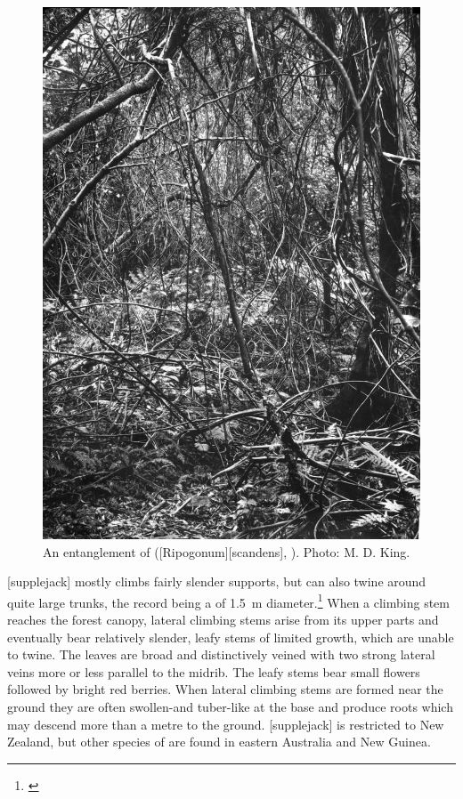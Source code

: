 \begin{figure}[t]
\begin{minipage}[t]{\textwidth}
\begin{minipage}[t]{(\textwidth-\fgap) * \real{0.488}}
			\includegraphics[width=\textwidth]{graphics/fig_033}
			\caption[An entanglement of supplejack]{An entanglement of  ([Ripogonum][scandens], ). Photo:  M. D. King.}%
			\label{fig:33supplejack}
		\end{minipage}
	\end{minipage}
\end{figure}

[supplejack] mostly climbs fairly slender supports, but can also twine around quite large trunks, the record being a  of \SI{1.5}{\metre} diameter.\footnote{\cite{macmillan1973biological}}
When a climbing stem reaches the forest canopy, lateral climbing stems arise from its upper parts and eventually bear relatively slender, leafy stems of limited growth, which are unable to twine.
The leaves are broad and distinctively veined with two strong lateral veins more or less parallel to the midrib.
The leafy stems bear small flowers followed by bright red berries.
When lateral climbing stems are formed near the ground they are often swollen-and tuber-like at the base and produce roots which may descend more than a metre to the ground.
[supplejack] is restricted to New Zealand, but other species of  are found in eastern Australia and New Guinea.

